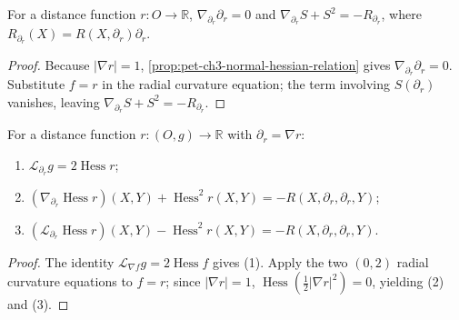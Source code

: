 \begin{corollary}
  \label{cor:pet-ch3-radial-equation-distance-function}


  For a distance function $r:O\to\mathbb R$, $\nabla_{\partial_r}\partial_r=0$ and
  $\nabla_{\partial_r}S+S^2=-R_{\partial_r}$, where $R_{\partial_r}(X)=R(X,\partial_r)\partial_r$.
\end{corollary}
\begin{proof}

  \sketch
  Because $|\nabla r|=1$, \cref{prop:pet-ch3-normal-hessian-relation} gives
  $\nabla_{\partial_r}\partial_r=0$. Substitute $f=r$ in the radial curvature
  equation; the term involving $S(\partial_r)$ vanishes, leaving
  $\nabla_{\partial_r}S+S^2=-R_{\partial_r}$.
\end{proof}

\begin{proposition}
  \label{prop:pet-ch3-distance-function-curvature-equations}


  For a distance function $r:(O,g)\to\mathbb R$ with $\partial_r=\nabla r$:
  \begin{enumerate}
    \item[(1)] $\mathcal L_{\partial_r}g=2\operatorname{Hess}r$;
    \item[(2)] $(\nabla_{\partial_r}\operatorname{Hess}r)(X,Y)+\operatorname{Hess}^2r(X,Y)=-R(X,\partial_r,\partial_r,Y)$;
    \item[(3)] $(\mathcal L_{\partial_r}\operatorname{Hess}r)(X,Y)-\operatorname{Hess}^2r(X,Y)=-R(X,\partial_r,\partial_r,Y)$.
  \end{enumerate}
\end{proposition}
\begin{proof}

  \sketch
  The identity
  $\mathcal L_{\nabla f}g=2\operatorname{Hess}f$ gives (1). Apply the two
  $(0,2)$ radial curvature equations to $f=r$; since $|\nabla r|=1$,
  $\operatorname{Hess}(\tfrac12|\nabla r|^2)=0$, yielding (2) and (3).
\end{proof}


